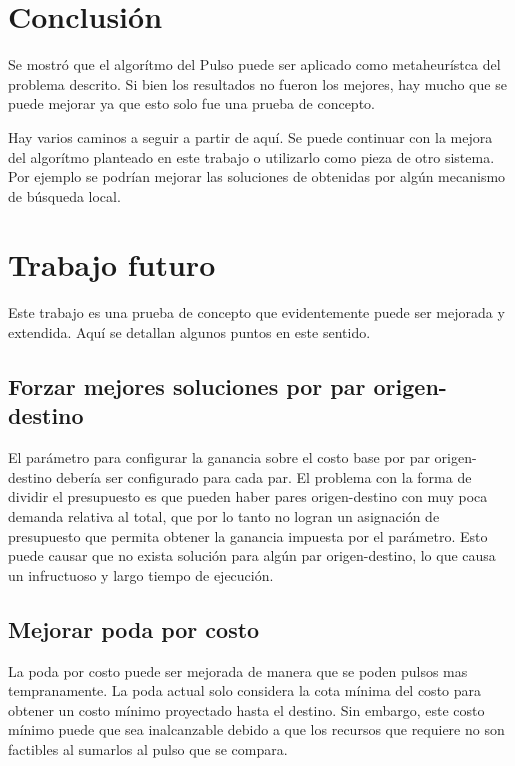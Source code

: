 \documentclass{article}
\begin{document}
  \section*{Conclusión}

  Se mostró que el algorítmo del Pulso puede ser aplicado como metaheurístca del problema descrito. Si bien los resultados no fueron los mejores, hay mucho que se puede mejorar ya que esto solo fue una prueba de concepto.

  Hay varios caminos a seguir a partir de aquí. Se puede continuar con la mejora del algorítmo planteado en este trabajo o utilizarlo como pieza de otro sistema. Por ejemplo se podrían mejorar las soluciones de obtenidas por algún mecanismo de búsqueda local.

  \section*{Trabajo futuro}

  Este trabajo es una prueba de concepto que evidentemente puede ser mejorada y extendida. Aquí se detallan algunos puntos en este sentido.

  \subsection*{Forzar mejores soluciones por par origen-destino}

  El parámetro para configurar la ganancia sobre el costo base por par origen-destino debería ser configurado para cada par. El problema con la forma de dividir el presupuesto es que pueden haber pares origen-destino con muy poca demanda relativa al total, que por lo tanto no logran un asignación de presupuesto que permita obtener la ganancia impuesta por el parámetro. Esto puede causar que no exista solución para algún par origen-destino, lo que causa un infructuoso y largo tiempo de ejecución.

  \subsection*{Mejorar poda por costo}

  La poda por costo puede ser mejorada de manera que se poden pulsos mas tempranamente. La poda actual solo considera la cota mínima del costo para obtener un costo mínimo proyectado hasta el destino. Sin embargo, este costo mínimo puede que sea inalcanzable debido a que los recursos que requiere no son factibles al sumarlos al pulso que se compara.
\end{document}
